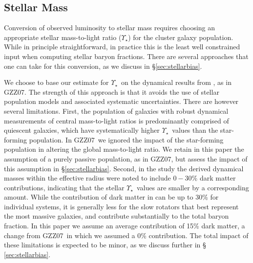 \documentclass[preprint]{emulateapj}
\newcommand\ptwo{GZZ07}
\newcommand{\mlrat}{$\Upsilon_\star$}
\begin{document}
\subsection{Stellar Mass}
\label{sec:stellarmass}

Conversion of observed luminosity to stellar mass requires choosing an
appropriate stellar mass-to-light ratio (\mlrat) for the cluster
galaxy population. While in principle straightforward, in practice
this is the least well constrained input when computing stellar baryon
fractions. There are several approaches that one can take for this
conversion, as we discuss in \S \ref{sec:stellarbias}.

We choose to base our estimate for \mlrat\ on the dynamical results
from \citet{cappellari2006}, as in \ptwo.  The strength of this
approach is that it avoids the use of stellar population models and
associated systematic uncertainties.  There are however several
limitations.  First, the population of galaxies with robust dynamical
measurements of central mass-to-light ratios is predominantly
comprised of quiescent galaxies, which have systematically higher
\mlrat\ values than the star-forming population. In \ptwo\ we ignored the
impact of the star-forming population in altering the global mass-to-light
ratio.  We retain in this paper the assumption of a purely passive
population, as in \ptwo, but assess the impact of this assumption in
\S \ref{sec:stellarbias}.  Second, in the \citet{cappellari2006} study
the derived dynamical masses within the effective radius were noted to
include $0-30$\% dark matter contributions, indicating that the
stellar \mlrat\ values are smaller by a corresponding amount.  While
the contribution of dark matter in \citet{cappellari2006} can be up to
30\% for individual systems, it is generally less for the slow
rotators that best represent the most massive galaxies, and contribute
substantially to the total baryon fraction.  In this paper we assume
an average contribution of 15\% dark matter, a change from \ptwo\ in
which we assumed a 0\% contribution. The total impact of these
limitations is expected to be minor, as we discuss further in \S
\ref{sec:stellarbias}.
\end{document}
